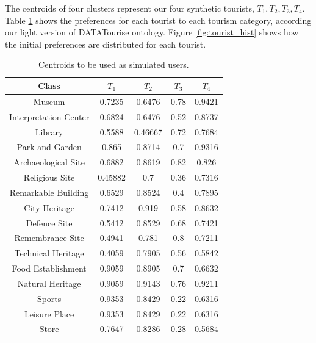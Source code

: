 The centroids of four clusters represent our four synthetic tourists, $T_1, T_2, T_3, T_4$. Table \ref{table:centroids} shows the preferences for each tourist to each tourism category, according our light version of DATATourise ontology.  Figure \ref{fig:tourist_hist} shows how the initial preferences are distributed for each tourist.
\begin{table}[h!]
\centering
\caption{Centroids to be used as simulated users.}
\label{table:centroids}
\begin{tabular}{ |c|c|c|c|c| } 
    \hline
    Class & $T_1$ & $T_2$ & $T_3$ & $T_4$ \\
    \hline
    \hline

    Museum & 0.7235 & 0.6476 & 0.78 & 0.9421 \\ 
    \hline
    Interpretation Center & 0.6824 & 0.6476 & 0.52 & 0.8737 \\
    \hline
    Library & 0.5588 & 0.46667 & 0.72 & 0.7684 \\
    \hline
    Park and Garden & 0.865 & 0.8714 & 0.7 & 0.9316 \\
    \hline
    Archaeological Site & 0.6882 & 0.8619 & 0.82 & 0.826 \\
    \hline
    Religious Site & 0.45882 & 0.7 & 0.36 & 0.7316 \\
    \hline
    Remarkable Building & 0.6529 & 0.8524 & 0.4 & 0.7895 \\
    \hline
    City Heritage & 0.7412 & 0.919 & 0.58 & 0.8632 \\
    \hline
    Defence Site & 0.5412 & 0.8529 & 0.68 & 0.7421 \\
    \hline
    Remembrance Site & 0.4941 & 0.781 & 0.8 & 0.7211 \\
    \hline
    Technical Heritage & 0.4059 & 0.7905 & 0.56 & 0.5842 \\
    \hline
    Food Establishment & 0.9059 & 0.8905 & 0.7 & 0.6632 \\
    \hline
    Natural Heritage & 0.9059 & 0.9143 & 0.76 & 0.9211 \\
    \hline
    Sports & 0.9353 & 0.8429 & 0.22 & 0.6316 \\
    \hline
    Leisure Place & 0.9353 & 0.8429 & 0.22 & 0.6316 \\
    \hline
    Store & 0.7647 & 0.8286 & 0.28 & 0.5684 \\
    
    \hline
\end{tabular}
\end{table}


